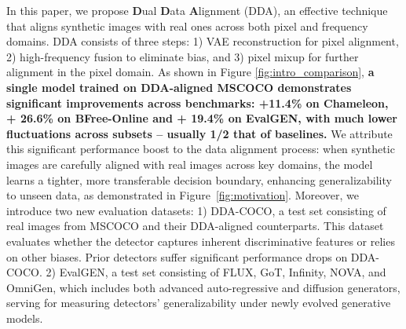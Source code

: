 \documentclass{article}
\newcommand{\high}{\textcolor{deepgreen}{\textbf{High}}}  %
\newcommand{\medium}{\textcolor{deeporange}{\textbf{Medium}}}  %
\newcommand{\low}{\textcolor{deepred}{\textbf{Low}}}    %
\begin{document}
In this paper, we propose \textbf{D}ual \textbf{D}ata \textbf{A}lignment (DDA), an effective technique that aligns synthetic images with real ones across both pixel and frequency domains. 
DDA consists of three steps: 1) VAE reconstruction for pixel alignment, 2) high-frequency fusion to eliminate bias, and 3) pixel mixup for further alignment in the pixel domain. As shown in Figure \ref{fig:intro_comparison},
\textbf{a single model trained on DDA-aligned MSCOCO demonstrates significant improvements across benchmarks: +11.4\% on Chameleon, + 26.6\% on BFree-Online and + 19.4\% on EvalGEN, with much lower fluctuations across subsets -- usually 1/2 that of baselines.} 
We attribute this significant performance boost to the data alignment process: when synthetic images are carefully aligned with real images across key domains, the model learns a tighter, more transferable decision boundary, enhancing generalizability to unseen data, as demonstrated in Figure~\ref{fig:motivation}.
Moreover, we introduce two new evaluation datasets: 1) DDA-COCO, a test set consisting of real images from MSCOCO and their DDA-aligned counterparts. This dataset evaluates whether the detector captures inherent discriminative features or relies on other biases. Prior detectors suffer significant performance drops on DDA-COCO.
2) EvalGEN, a test set consisting of FLUX, GoT, Infinity, NOVA, and OmniGen, which includes both advanced auto-regressive and diffusion generators, serving for measuring detectors' generalizability under newly evolved generative models.


\end{document}
